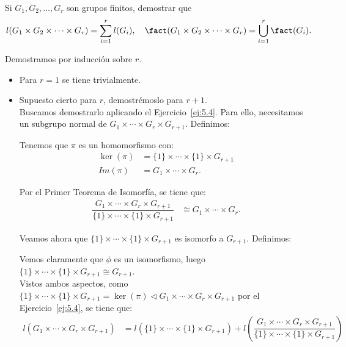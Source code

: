 \begin{ejercicio}\label{ej:5.7}
    Si $G_1, G_2, \ldots, G_r$ son grupos finitos, demostrar que
    \[
        l(G_1 \times G_2 \times \cdots \times G_r) = \sum_{i=1}^{r} l(G_i), \quad \fact(G_1 \times G_2 \times \cdots \times G_r) = \bigcup_{i=1}^{r} \fact(G_i).
    \]

    Demostramos por inducción sobre $r$.
    \begin{itemize}
        \item Para $r=1$ se tiene trivialmente.
        \item Supuesto cierto para $r$, demostrémoslo para $r+1$.\\
        
        Buscamos demostrarlo aplicando el Ejercicio~\ref{ej:5.4}. Para ello, necesitamos un subgrupo normal de $G_1 \times \cdots \times G_r \times G_{r+1}$. Definimos:

        Tenemos que $\pi$ es un homomorfismo con:
        \begin{align*}
            \ker(\pi) &= \{1\}\times \cdots \times \{1\} \times G_{r+1} \\
            Im(\pi) &= G_1\times \cdots \times G_r.
        \end{align*}

        Por el Primer Teorema de Isomorfía, se tiene que:
        \begin{align*}
            \dfrac{G_1 \times \cdots \times G_r \times G_{r+1}}{\{1\}\times \cdots \times \{1\} \times G_{r+1}} &\cong G_1\times \cdots \times G_r.
        \end{align*}

        Veamos ahora que $\{1\}\times \cdots \times \{1\} \times G_{r+1}$ es isomorfo a $G_{r+1}$. Definimos:

        Vemos claramente que $\phi$ es un isomorfismo, luego $\{1\}\times \cdots \times \{1\} \times G_{r+1} \cong G_{r+1}$.\\

        Vistos ambos aspectos, como $\{1\}\times \cdots \times \{1\} \times G_{r+1}=\ker(\pi) \lhd G_1 \times \cdots \times G_r \times G_{r+1}$ por el Ejercicio~\ref{ej:5.4}, se tiene que:
        \begin{align*}
            l(G_1 \times \cdots \times G_r \times G_{r+1}) &= l(\{1\}\times \cdots \times \{1\} \times G_{r+1}) + l\left(\dfrac{G_1 \times \cdots \times G_r \times G_{r+1}}{\{1\}\times \cdots \times \{1\} \times G_{r+1}}\right)
        \end{align*}


\end{itemize}
\end{ejercicio}
